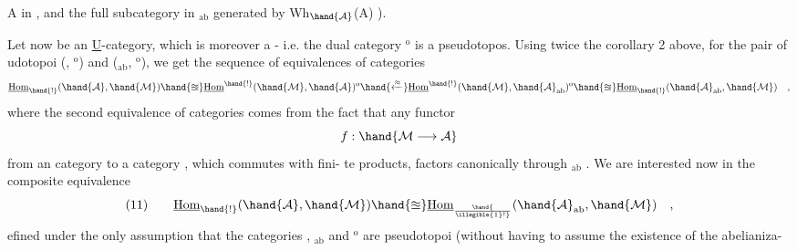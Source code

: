 
A in  , and the full subcategory in $_{\mathrm{ab}}$ generated by Wh$_{\hand{\mathcal{A}}}$(A) ).

Let now  be an \hand{\uline{\textcolor{black}{additive}}} \uline{U}-category, which is moreover a
\hand{\uline{\textcolor{black}{pseudo}}}-\hand{\uline{\textcolor{black}{cotopos}}} i.e. the dual category $^{\mathrm{o}}$ is a pseudotopos. Using
twice the corollary 2 above, for the pair of udo\-topoi (, $^{\mathrm{o}}$)
and ($_{\mathrm{ab}}$, $^{\mathrm{o}}$), we get the sequence of equivalences of categories
\[ \underline{\mathrm{Hom}}_{\hand{!}}(\hand{\mathcal{A}},\hand{\mathcal{M}}) \hand{\approxeq} \underline{\mathrm{Hom}}^{\hand{!}}(\hand{\mathcal{M}},\hand{\mathcal{A}})^{\mathrm{o}} \hand{\xleftarrow{\approx}} \underline{\mathrm{Hom}}^{\hand{!}}(\hand{\mathcal{M}},\hand{\mathcal{A}}_{\mathrm{ab}})^{\mathrm{o}} \hand{\approxeq} \underline{\mathrm{Hom}}_{\hand{!}}(\hand{\mathcal{A}}_{\mathrm{ab}},\hand{\mathcal{M}}) \quad , \]
where the second equivalence of categories comes from the fact that
any functor
\[ f: \hand{\mathcal{M} \longrightarrow \mathcal{A}} \]
from an \hand{\uline{\textcolor{black}{additive}}} category  to a category , which commutes with fini-%
te products, factors canonically through $_{\mathrm{ab}}$ . We are interested
now in the composite equivalence
\[ (11) \qquad \underline{\mathrm{Hom}}_{\hand{!}}(\hand{\mathcal{A}},\hand{\mathcal{M}}) \hand{\approxeq} \underline{\mathrm{Hom}}_{\hand{\over{\illegible{1}}{!}}}(\hand{\mathcal{A}}_{\mathrm{ab}},\hand{\mathcal{M}}) \quad , \]
efined under the only assumption that  the categories  , $_{\mathrm{ab}}$ and $^{\mathrm{o}}$
are pseudotopoi (without having to assume the existence of the abelianiza-%
